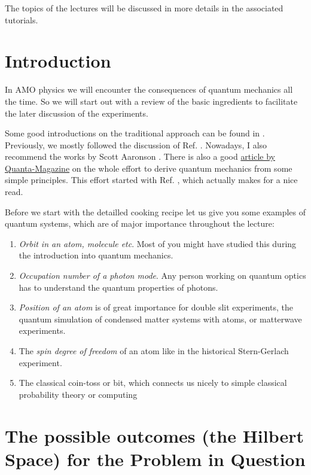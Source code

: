 \documentclass[10pt]{article}
\let\cite\citep
\providecommand\citep{\cite}
\begin{document}
The topics of the lectures will be discussed in more details in the associated tutorials. 

\section{Introduction}
In AMO physics we will encounter the consequences of quantum mechanics all the time. So we will start out with a review of the basic ingredients to facilitate the later discussion of the experiments. 

Some good introductions on the traditional approach can be found in \cite{2002, 2006} \cite{1}\cite{2}. Previously, we mostly followed the discussion of Ref. \cite{2006}. Nowadays, I also recommend the works by Scott Aaronson \cite{quantum,holes}. There is also a good \href{https://www.quantamagazine.org/quantum-theory-rebuilt-from-simple-physical-principles-20170830/#}{article by Quanta-Magazine} on the whole effort to derive quantum mechanics from some simple principles. This effort started with Ref. \cite{axioms}, which actually makes for a nice read.

Before we start with the detailled cooking recipe let us give you some examples of  quantum systems, which are of major importance throughout the lecture:
\begin{enumerate}
\item \textit{Orbit in an atom, molecule etc}. Most of you might have studied this during the introduction into quantum mechanics.
\item \textit{Occupation number of a photon mode}. Any person working on quantum optics has to understand the quantum properties of photons.
\item \textit{Position of an atom} is of great importance for double slit experiments, the quantum simulation of condensed matter systems with atoms,  or matterwave experiments.
\item The \textit{spin degree of freedom} of an atom like in the historical Stern-Gerlach experiment. 
\item The classical coin-toss or bit, which connects us nicely to simple classical probability theory or computing
\end{enumerate}

\section{The possible outcomes  (the Hilbert Space) for the Problem in Question}
\end{document}
